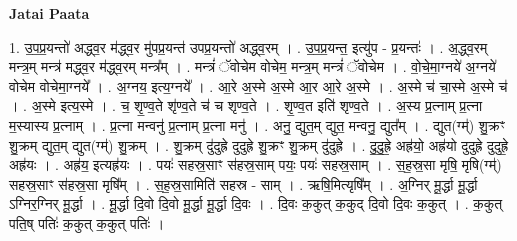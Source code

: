 \documentclass[17pt]{extarticle}
\begin{document}
\textbf{Jatai Paata} \newline

1. उ॒प॒प्र॒यन्तो॑ अद्ध्व॒र म॑द्ध्व॒र मु॑पप्र॒यन्त॑ उपप्र॒यन्तो॑ अद्ध्व॒रम् । . उ॒प॒प्र॒यन्त॒ इत्यु॑प - प्र॒यन्तः॑ । . अ॒द्ध्व॒रम् मन्त्र॒म् मन्त्र॑ मद्ध्व॒र म॑द्ध्व॒रम् मन्त्र᳚म् । . मन्त्रं॑ ॅवोचेम वोचेम॒ मन्त्र॒म् मन्त्रं॑ ॅवोचेम । . वो॒चे॒मा॒ग्नये॑ अ॒ग्नये॑ वोचेम वोचेमा॒ग्नये᳚ । . अ॒ग्नय॒ इत्य॒ग्नये᳚ । . आ॒रे अ॒स्मे अ॒स्मे आ॒र आ॒रे अ॒स्मे । . अ॒स्मे च॑ चा॒स्मे अ॒स्मे च॑ । . अ॒स्मे इत्य॒स्मे । . च॒ शृ॒ण्व॒ते शृ॑ण्व॒ते च॑ च शृण्व॒ते । . शृ॒ण्व॒त इति॑ शृण्व॒ते । . अ॒स्य प्र॒त्नाम् प्र॒त्ना म॒स्यास्य प्र॒त्नाम् । . प्र॒त्ना मन्वनु॑ प्र॒त्नाम् प्र॒त्ना मनु॑ । . अनु॒ द्युत॒म् द्युत॒ मन्वनु॒ द्युत᳚म् । . द्युत(ग्म्॑) शु॒क्रꣳ शु॒क्रम् द्युत॒म् द्युत(ग्म्॑) शु॒क्रम् । . शु॒क्रम् दु॑दुह्रे दुदुह्रे शु॒क्रꣳ शु॒क्रम् दु॑दुह्रे । . दु॒दु॒ह्रे॒ अह्र॑यो॒ अह्र॑यो दुदुह्रे दुदुह्रे॒ अह्र॑यः । . अह्र॑य॒ इत्यह्र॑यः । . पयः॑ सहस्र॒साꣳ स॑हस्र॒साम् पयः॒ पयः॑ सहस्र॒साम् । . स॒ह॒स्र॒सा मृषि॒ मृषि(ग्म्॑) सहस्र॒साꣳ स॑हस्र॒सा मृषि᳚म् । . स॒ह॒स्र॒सामिति॑ सहस्र - साम् । . ऋषि॒मित्यृषि᳚म् । . अ॒ग्निर् मू॒र्द्धा मू॒र्द्धा ऽग्निर॒ग्निर् मू॒र्द्धा । . मू॒र्द्धा दि॒वो दि॒वो मू॒र्द्धा मू॒र्द्धा दि॒वः । . दि॒वः क॒कुत् क॒कुद् दि॒वो दि॒वः क॒कुत् । . क॒कुत् पति॒ष् पतिः॑ क॒कुत् क॒कुत् पतिः॑ । \newline
\end{document}
